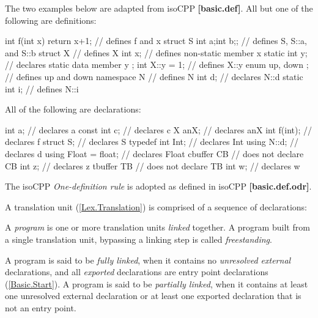 \p The two examples below are adapted from \gls{isoCPP} \textbf{[basic.def]}. All
but one of the following are definitions:
\begin{HLSL}
int f(int x) { return x+1; } // defines f and x
struct S {int a;int b;};     // defines S, S::a, and S::b
struct X {                   // defines X
  int x;                     // defines non-static member x
  static int y;              // declares static data member y
};
int X::y = 1;                // defines X::y
enum { up, down };           // defines up and down
namespace N {                // defines N
int d;                       // declares N::d
static int i;                // defines N::i
}
\end{HLSL}

\p All of the following are declarations:
\begin{HLSL}
int a;                       // declares a
const int c;                 // declares c
X anX;                       // declares anX
int f(int);                  // declares f
struct S;                    // declares S
typedef int Int;             // declares Int
using N::d;                  // declares d
using Float = float;         // declares Float
cbuffer CB {                 // does not declare CB
  int z;                     // declares z
}
tbuffer TB {                 // does not declare TB
  int w;                     // declares w
}
\end{HLSL}


\p The \gls{isoCPP} \textit{One-definition rule} is adopted as defined in
\gls{isoCPP} \textbf{[basic.def.odr]}.




\p A translation unit (\ref{Lex.Translation}) is comprised of a sequence of
declarations:

\begin{grammar}
  \br
\end{grammar}

\p A \textit{program} is one or more translation units \textit{linked} together.
A program built from a single translation unit, bypassing a linking step is
called \textit{freestanding}.

\p A program is said to be \textit{fully linked}, when it contains no
\textit{unresolved external} declarations, and all \textit{exported}
declarations are entry point declarations (\ref{Basic.Start}). A program is said
to be \textit{partially linked}, when it contains at least one unresolved
external declaration or at least one exported declaration that is not an entry
point.

